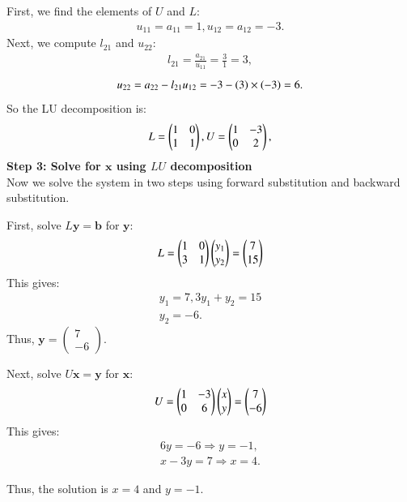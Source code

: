 \documentclass[journal]{IEEEtran}
\begin{document}
First, we find the elements of $U$ and $L$:  
\begin{align}  
u_{11} = a_{11} = 1, u_{12} = a_{12} = -3.  
\end{align}  
Next, we compute $l_{21}$ and $u_{22}$:  
\begin{align}  
l_{21} = \frac{a_{21}}{u_{11}} = \frac{3}{1} = 3,  
\end{align}  
\begin{align}  
u_{22} = a_{22} - l_{21} u_{12} = -3 - \left(3\right) \times \left(-3\right) = 6.  
\end{align}  
So the LU decomposition is:  
\begin{align}
    L=\begin{pmatrix}1 & 0\\1 & 1\end{pmatrix},
    U=\begin{pmatrix}1 & -3\\0 & 2\end{pmatrix},
\end{align}
\textbf{Step 3: Solve for $\mathbf{x}$ using $LU$ decomposition}  \\
Now we solve the system in two steps using forward substitution and backward substitution.  

First, solve $L \mathbf{y} = \mathbf{b}$ for $\mathbf{y}$:  
\begin{align}  
     L=\begin{pmatrix}1 & 0\\3 & 1\end{pmatrix}\begin{pmatrix}y_1\\y_2\end{pmatrix} = \begin{pmatrix}7\\15\end{pmatrix}
\end{align}  
This gives:  
\begin{align}  
y_1 = 7, 3y_1 + y_2 = 15 \\
 y_2 = -6.  
\end{align}  
Thus, $\mathbf{y} = \begin{pmatrix} 7 \\ -6 \end{pmatrix}$.  

Next, solve $U \mathbf{x} = \mathbf{y}$ for $\mathbf{x}$:  
\begin{align}
    U=\begin{pmatrix}1 & -3\\0 & 6\end{pmatrix}\begin{pmatrix}x \\ y\end{pmatrix} = \begin{pmatrix}7\\-6\end{pmatrix}
\end{align}
This gives:  
\begin{align}  
6y = -6 \Rightarrow y = -1, \\  
x - 3y = 7\Rightarrow x= 4.  
\end{align}  

Thus, the solution is $x = 4$ and $y = -1$.  
\end{document}
